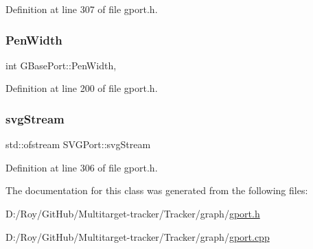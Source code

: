 Definition at line 307 of file gport.\+h.

\mbox{\label{class_g_base_port_a9a76c3a8af8d0e9f29035d02d8f038c1}} 
\subsubsection{\texorpdfstring{Pen\+Width}{PenWidth}}
{\footnotesize\ttfamily int G\+Base\+Port\+::\+Pen\+Width\hspace{0.3cm}{\ttfamily [protected]}, {\ttfamily [inherited]}}



Definition at line 200 of file gport.\+h.

\mbox{\label{class_s_v_g_port_ad3e240ca528cd784e138dce907d5d45a}} 
\subsubsection{\texorpdfstring{svg\+Stream}{svgStream}}
{\footnotesize\ttfamily std\+::ofstream S\+V\+G\+Port\+::svg\+Stream\hspace{0.3cm}{\ttfamily [protected]}}



Definition at line 306 of file gport.\+h.



The documentation for this class was generated from the following files\+:\begin{DoxyCompactItemize}
\item 
D\+:/\+Roy/\+Git\+Hub/\+Multitarget-\/tracker/\+Tracker/graph/\mbox{\hyperlink{gport_8h}{gport.\+h}}\item 
D\+:/\+Roy/\+Git\+Hub/\+Multitarget-\/tracker/\+Tracker/graph/\mbox{\hyperlink{gport_8cpp}{gport.\+cpp}}\end{DoxyCompactItemize}
